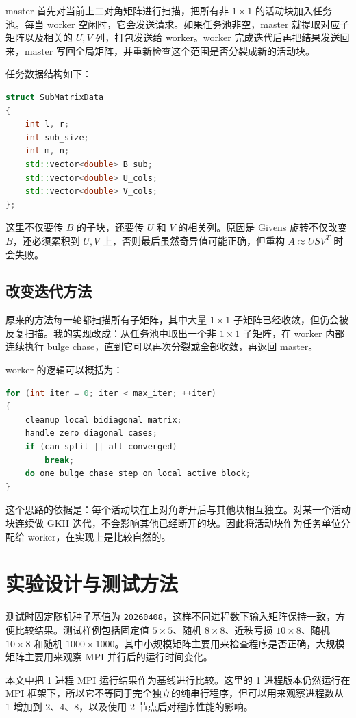 \documentclass[UTF8,a4paper,12pt]{ctexart}
\begin{document}
master 首先对当前上二对角矩阵进行扫描，把所有非 $1\times1$ 的活动块加入任务池。每当 worker 空闲时，它会发送请求。如果任务池非空，master 就提取对应子矩阵以及相关的 $U,V$ 列，打包发送给 worker。worker 完成迭代后再把结果发送回来，master 写回全局矩阵，并重新检查这个范围是否分裂成新的活动块。

任务数据结构如下：
\begin{lstlisting}[language=C++]
struct SubMatrixData
{
    int l, r;
    int sub_size;
    int m, n;
    std::vector<double> B_sub;
    std::vector<double> U_cols;
    std::vector<double> V_cols;
};
\end{lstlisting}

这里不仅要传 $B$ 的子块，还要传 $U$ 和 $V$ 的相关列。原因是 Givens 旋转不仅改变 $B$，还必须累积到 $U,V$ 上，否则最后虽然奇异值可能正确，但重构 $A\approx USV^T$ 时会失败。

\subsection{改变迭代方法}

原来的方法每一轮都扫描所有子矩阵，其中大量 $1\times1$ 子矩阵已经收敛，但仍会被反复扫描。我的实现改成：从任务池中取出一个非 $1\times1$ 子矩阵，在 worker 内部连续执行 bulge chase，直到它可以再次分裂或全部收敛，再返回 master。

worker 的逻辑可以概括为：
\begin{lstlisting}[language=C++]
for (int iter = 0; iter < max_iter; ++iter)
{
    cleanup local bidiagonal matrix;
    handle zero diagonal cases;
    if (can_split || all_converged)
        break;
    do one bulge chase step on local active block;
}
\end{lstlisting}

这个思路的依据是：每个活动块在上对角断开后与其他块相互独立。对某一个活动块连续做 GKH 迭代，不会影响其他已经断开的块。因此将活动块作为任务单位分配给 worker，在实现上是比较自然的。

\section{实验设计与测试方法}

测试时固定随机种子基值为 \texttt{20260408}，这样不同进程数下输入矩阵保持一致，方便比较结果。测试样例包括固定值 $5\times5$、随机 $8\times8$、近秩亏损 $10\times8$、随机 $10\times8$ 和随机 $1000\times1000$。其中小规模矩阵主要用来检查程序是否正确，大规模矩阵主要用来观察 MPI 并行后的运行时间变化。

本文中把 1 进程 MPI 运行结果作为基线进行比较。这里的 1 进程版本仍然运行在 MPI 框架下，所以它不等同于完全独立的纯串行程序，但可以用来观察进程数从 1 增加到 2、4、8，以及使用 2 节点后对程序性能的影响。
\end{document}
